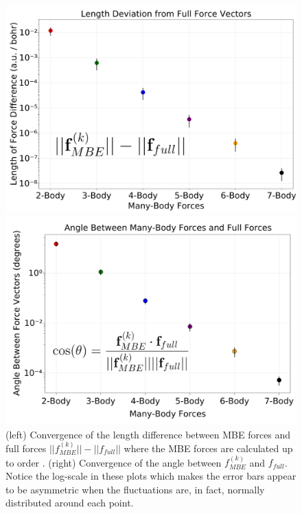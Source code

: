 \begin{figure}[h]
\uwsinglespace
\begin{center}
\begin{minipage}{0.45\textwidth}
\includegraphics[width=\textwidth]{Figures/Chapter_4/ch4_figure_6_top.png}
\end{minipage}
\begin{minipage}{0.45\textwidth}
\includegraphics[width=\textwidth]{Figures/Chapter_4/ch4_figure_6_bottom.png}
\end{minipage}
\end{center}
\caption[(Convergence of the length difference between MBE forces and full forces $||f^{(k)}_{MBE}||-||f_{full}||$ where the MBE forces are calculated up to order . (6b, right) Convergence of the angle between $f^{(k)}_{MBE}$ and $f_{full}$.]{(left) Convergence of the length difference between MBE forces and full forces $||f^{(k)}_{MBE}||-||f_{full}||$ where the MBE forces are calculated up to order . (right) Convergence of the angle between $f^{(k)}_{MBE}$ and $f_{full}$. Notice the log-scale in these plots which makes the error bars appear to be asymmetric when the fluctuations are, in fact, normally distributed around each point.}
\label{fig:MBE_MD_F6}
\end{figure}